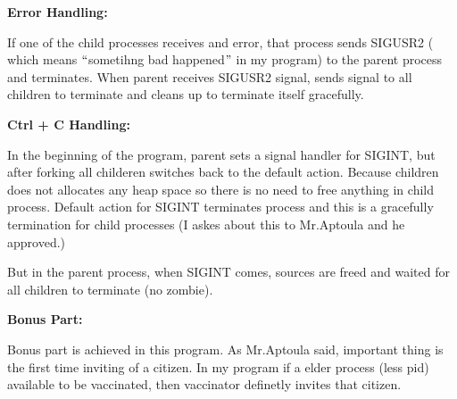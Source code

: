 \documentclass[12pt]{report}
\renewcommand{\_}{\kern-1.5pt\textunderscore\kern-1.5pt}
\begin{document}
\vspace{\baselineskip}
\begin{FlushLeft}
{\fontsize{14pt}{16.8pt}\selectfont \textbf{Error Handling:}} 
\end{FlushLeft}
\begin{FlushLeft}
If one of the child processes receives and error, that process sends SIGUSR2 ( which means $``$sometihng bad happened$"$  in my program) to the parent process and terminates. When parent receives SIGUSR2 signal, sends signal to all children to terminate and cleans up to terminate itself gracefully.
\end{FlushLeft}

\vspace{\baselineskip}
\begin{FlushLeft}
{\fontsize{14pt}{16.8pt}\selectfont \textbf{Ctrl + C Handling:}} 
\end{FlushLeft}
\begin{FlushLeft}
In the beginning of the program, parent sets a signal handler for SIGINT, but after forking all childeren switches back to the default action. Because children does not allocates any heap space so there is no need to free anything in child process. Default action for SIGINT terminates process and this is a gracefully termination for child processes (I askes about this to Mr.Aptoula and he approved.)
\end{FlushLeft}
\begin{FlushLeft}
But in the parent process, when SIGINT comes, sources are freed and waited for all children to terminate (no zombie).
\end{FlushLeft}

\vspace{\baselineskip}
\begin{FlushLeft}
{\fontsize{14pt}{16.8pt}\selectfont \textbf{Bonus Part:}}
\end{FlushLeft}
\begin{FlushLeft}
Bonus part is achieved in this program. As Mr.Aptoula said, important thing is the first time inviting of a citizen. In my program if a elder process (less pid) available to be vaccinated, then vaccinator definetly invites that citizen.
\end{FlushLeft}
\end{document}
